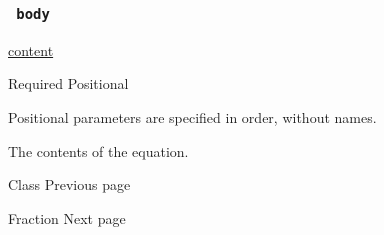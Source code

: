 \subsubsection{\texorpdfstring{\texttt{\ body\ }}{ body }}\label{parameters-body}

\href{/docs/reference/foundations/content/}{content}

{Required} {{ Positional }}

\label{parameters-body-positional-tooltip}
Positional parameters are specified in order, without names.

The contents of the equation.

\href{/docs/reference/math/class/}{\pandocbounded{}}

{ Class } { Previous page }

\href{/docs/reference/math/frac/}{\pandocbounded{}}

{ Fraction } { Next page }
